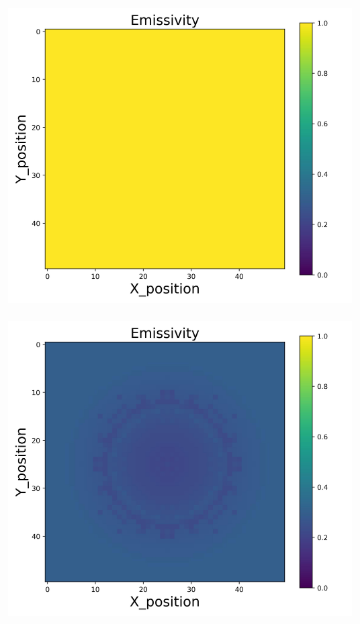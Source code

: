 {\begin{figure}[h]
    \centering
    \begin{minipage}{\textwidth}
        \centering
        \begin{subfigure}{0.27\textwidth}
            \centering
            \includegraphics[width=\textwidth]{figures/raw_data/0/T3500/lin_square/emi_cal.jpg}
        \end{subfigure}
        \begin{subfigure}{0.27\textwidth}
            \centering
            \includegraphics[width=\textwidth]{figures/raw_data/5/T3500/lin_square/emi_cal.jpg}

\end{subfigure}
\end{minipage}
\end{figure}}
